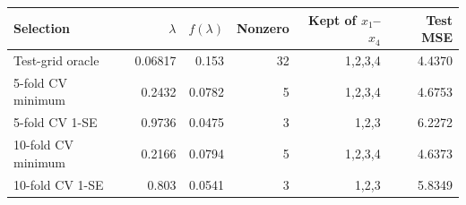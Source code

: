 \begin{center}
\small
\setlength{\tabcolsep}{4pt}
\begin{tabular}{lrrrrr}
\toprule
Selection & $\lambda$ & $f(\lambda)$ & Nonzero & Kept of $x_1$--$x_4$ & Test MSE \\
\midrule
Test-grid oracle & 0.06817 & 0.153 & 32 & 1,2,3,4 & 4.4370 \\
5-fold CV minimum & 0.2432 & 0.0782 & 5 & 1,2,3,4 & 4.6753 \\
5-fold CV 1-SE & 0.9736 & 0.0475 & 3 & 1,2,3 & 6.2272 \\
10-fold CV minimum & 0.2166 & 0.0794 & 5 & 1,2,3,4 & 4.6373 \\
10-fold CV 1-SE & 0.803 & 0.0541 & 3 & 1,2,3 & 5.8349 \\
\bottomrule
\end{tabular}
\end{center}
